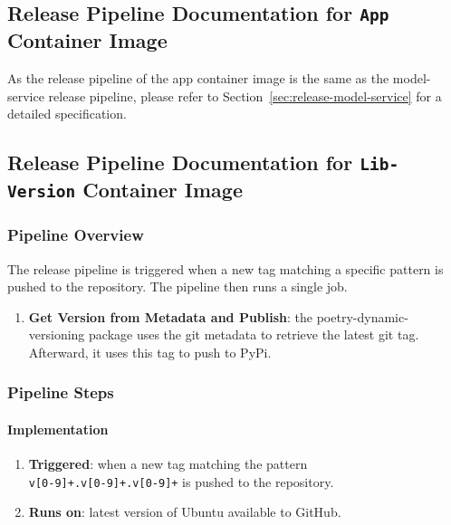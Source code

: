 \subsection{Release Pipeline Documentation for \texttt{App} Container Image}
As the release pipeline of the app container image is the same as the model-service release pipeline, please refer to Section~\ref{sec:release-model-service} for a detailed specification.

\subsection{Release Pipeline Documentation for \texttt{Lib-Version} Container Image}
\subsubsection{Pipeline Overview}
The release pipeline is triggered when a new tag matching a specific pattern is pushed to the repository. The pipeline then runs a single job. 
\begin{enumerate}
    \item \textbf{Get Version from Metadata and Publish}: the poetry-dynamic-versioning package uses the git metadata to retrieve the latest git tag. Afterward, it uses this tag to push to PyPi. 
\end{enumerate}
\subsubsection{Pipeline Steps}
\paragraph{Implementation}
\begin{enumerate}
    \item \textbf{Triggered}: when a new tag matching the pattern \\\verb|v[0-9]+.v[0-9]+.v[0-9]+| is pushed to the repository.
    \item \textbf{Runs on}: latest version of Ubuntu available to GitHub. 
\end{enumerate}
